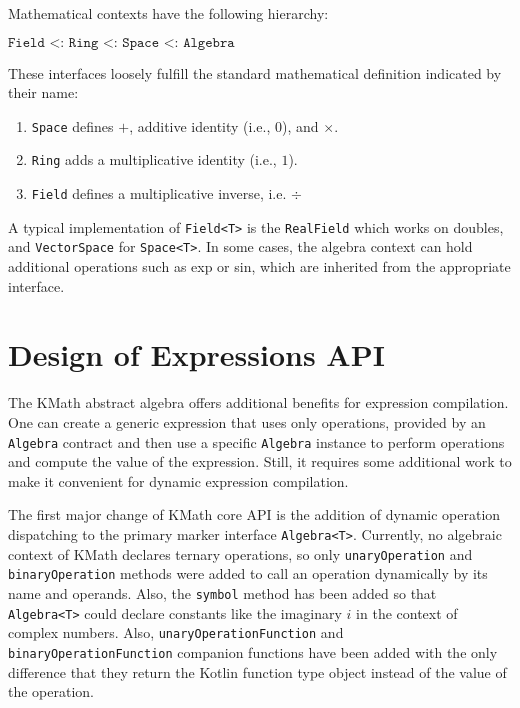 \documentclass[conference]{IEEEtran}
\begin{document}
Mathematical contexts have the following hierarchy:

$\texttt{Field <: Ring <: Space <: Algebra}$

These interfaces loosely fulfill the standard mathematical definition indicated by their name:

\begin{enumerate}
    \item \texttt{Space} defines $+$, additive identity (i.e., $0$), and $\times$.
    \item \texttt{Ring} adds a multiplicative identity (i.e., $1$).
    \item \texttt{Field} defines a multiplicative inverse, i.e. $\div$
\end{enumerate}

A typical implementation of \texttt{Field<T>} is the \texttt{RealField} which works on doubles, and \texttt{VectorSpace} for \texttt{Space<T>}. In some cases, the algebra context can hold additional operations such as exp or sin, which are inherited from the appropriate interface. 


\section{Design of Expressions API}

The KMath abstract algebra offers additional benefits for expression compilation. One can create a generic expression that uses only operations, provided by an \texttt{Algebra} contract and then use a specific \texttt{Algebra} instance to perform operations and compute the value of the expression. Still, it requires some additional work to make it convenient for dynamic expression compilation.

The first major change of KMath core API is the addition of dynamic operation dispatching to the primary marker interface \texttt{Algebra<T>}. Currently, no algebraic context of KMath declares ternary operations, so only \texttt{unaryOperation} and \texttt{binaryOperation} methods were added to call an operation dynamically by its name and operands. Also, the \texttt{symbol} method has been added so that \texttt{Algebra<T>} could declare constants like the imaginary $i$ in the context of complex numbers. Also, \texttt{unaryOperationFunction} and \texttt{binaryOperationFunction} companion functions have been added with the only difference that they return the Kotlin function type object instead of the value of the operation.
\end{document}
